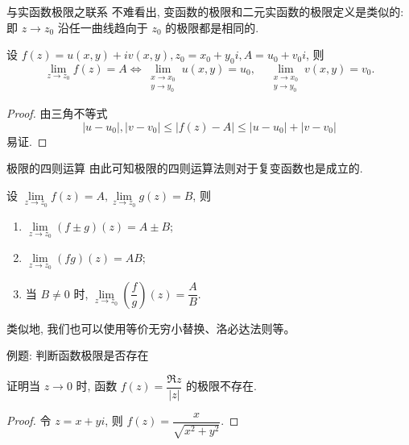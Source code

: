 \begin{frame}{与实函数极限之联系}
	\onslide<+->
	不难看出, 变函数的极限和二元实函数的极限定义是类似的:
	\onslide<+->
	即 $z\to z_0$ 沿任一曲线趋向于 $z_0$ 的极限都是相同的.

	\onslide<+->
	\begin{theorem}
		设 $f(z)=u(x,y)+iv(x,y),z_0=x_0+y_0i,A=u_0+v_0i$, 则
		\[\lim_{z\to z_0}f(z)=A\iff
		\lim_{\substack{x\to x_0\\y\to y_0}}u(x,y)=u_0,\quad
		\lim_{\substack{x\to x_0\\y\to y_0}}v(x,y)=v_0.\]
		\vspace{-0.5\baselineskip}
	\end{theorem}

	\onslide<+->
	\begin{proof}
		由三角不等式
		\[|u-u_0|,|v-v_0|\le|f(z)-A|\le|u-u_0|+|v-v_0|\]
		易证.
	\end{proof}
\end{frame}


\begin{frame}{极限的四则运算}
	\onslide<+->
	由此可知极限的四则运算法则对于复变函数也是成立的.

	\onslide<+->
	\begin{theorem}
		设 $\lim\limits_{z\to z_0}f(z)=A,\lim\limits_{z\to z_0}g(z)=B$, 则
		\begin{enumerate}
			\item $\lim\limits_{z\to z_0}(f\pm g)(z)=A\pm B$;
			\item $\lim\limits_{z\to z_0}(fg)(z)=AB$;
			\item 当 $B\neq 0$ 时, $\lim\limits_{z\to z_0}\left(\dfrac fg\right)(z)=\dfrac AB$.
		\end{enumerate}
	\end{theorem}

	\onslide<+->
	类似地, 我们也可以使用等价无穷小替换、洛必达法则等。
\end{frame}


\begin{frame}{例题: 判断函数极限是否存在}
	\onslide<+->
	\begin{example}
		证明当 $z\to0$ 时, 函数 $f(z)=\dfrac{\Re z}{|z|}$ 的极限不存在.
	\end{example}

	\onslide<+->
	\begin{proof}
		令 $z=x+yi$, 则 $f(z)=\dfrac x{\sqrt{x^2+y^2}}$.
		\onslide<+->{因此
			\[u(x,y)=\frac x{\sqrt{x^2+y^2}},\quad v(x,y)=0.\]}

	\end{proof}
\end{frame}


